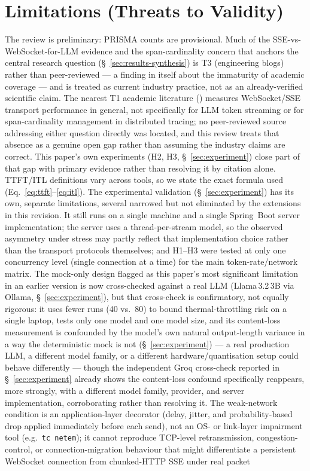 \documentclass[11pt]{article}
\begin{document}
\section{Limitations (Threats to Validity)}
\label{sec:limitations}
The review is preliminary: PRISMA counts are provisional. Much of the SSE-vs-WebSocket-for-LLM evidence and the span-cardinality concern that anchors the central research question (\S~\ref{sec:results-synthesis}) is T3 (engineering blogs) rather than peer-reviewed --- a finding in itself about the immaturity of academic coverage --- and is treated as current industry practice, not as an already-verified scientific claim. The nearest T1 academic literature (\cite{ws2014,ws2019,ws2016bench,murley2021}) measures WebSocket/SSE transport performance in general, not specifically for LLM token streaming or for span-cardinality management in distributed tracing; no peer-reviewed source addressing either question directly was located, and this review treats that absence as a genuine open gap rather than assuming the industry claims are correct. This paper's own experiments (H2, H3, \S~\ref{sec:experiment}) close part of that gap with primary evidence rather than resolving it by citation alone. TTFT/ITL definitions vary across tools, so we state the exact formula used (Eq.~\eqref{eq:ttft}--\eqref{eq:itl}). The experimental validation (\S~\ref{sec:experiment}) has its own, separate limitations, several narrowed but not eliminated by the extensions in this revision. It still runs on a single machine and a single Spring~Boot server implementation; the server uses a thread-per-stream model, so the observed asymmetry under stress may partly reflect that implementation choice rather than the transport protocols themselves; and H1--H3 were tested at only one concurrency level (single connection at a time) for the main token-rate/network matrix. The mock-only design flagged as this paper's most significant limitation in an earlier version is now cross-checked against a real LLM (Llama\,3.2\,3B via Ollama, \S~\ref{sec:experiment}), but that cross-check is confirmatory, not equally rigorous: it uses fewer runs (40 vs.\ 80) to bound thermal-throttling risk on a single laptop, tests only one model and one model size, and its content-loss measurement is confounded by the model's own natural output-length variance in a way the deterministic mock is not (\S~\ref{sec:experiment}) --- a real production LLM, a different model family, or a different hardware/quantisation setup could behave differently --- though the independent Groq cross-check reported in \S~\ref{sec:experiment} already shows the content-loss confound specifically reappears, more strongly, with a different model family, provider, and server implementation, corroborating rather than resolving it. The weak-network condition is an application-layer decorator (delay, jitter, and probability-based drop applied immediately before each send), not an OS- or link-layer impairment tool (e.g.\ \texttt{tc netem}); it cannot reproduce TCP-level retransmission, congestion-control, or connection-migration behaviour that might differentiate a persistent WebSocket connection from chunked-HTTP SSE under real packet 
\end{document}
